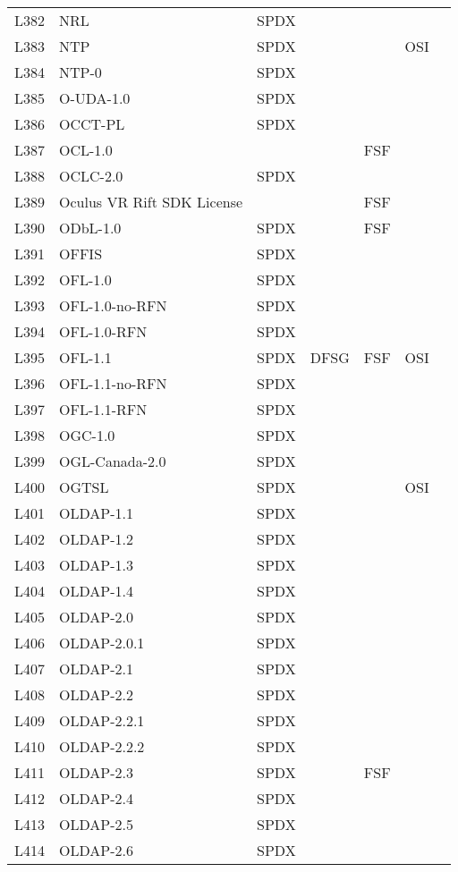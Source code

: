 \begin{longtable}[h]{m{2cm} | m{7cm} | c | c | c | c | c}
L382 & NRL & SPDX &  &  &  &  \\
L383 & NTP & SPDX &  &  & OSI &  \\
L384 & NTP-0 & SPDX &  &  &  &  \\
L385 & O-UDA-1.0 & SPDX &  &  &  &  \\
L386 & OCCT-PL & SPDX &  &  &  &  \\
L387 & OCL-1.0 &  &  & FSF &  &  \\
L388 & OCLC-2.0 & SPDX &  &  &  &  \\
L389 & Oculus VR Rift SDK License &  &  & FSF &  &  \\
L390 & ODbL-1.0 & SPDX &  & FSF &  &  \\
L391 & OFFIS & SPDX &  &  &  &  \\
L392 & OFL-1.0 & SPDX &  &  &  &  \\
L393 & OFL-1.0-no-RFN & SPDX &  &  &  &  \\
L394 & OFL-1.0-RFN & SPDX &  &  &  &  \\
L395 & OFL-1.1 & SPDX & DFSG & FSF & OSI &  \\
L396 & OFL-1.1-no-RFN & SPDX &  &  &  &  \\
L397 & OFL-1.1-RFN & SPDX &  &  &  &  \\
L398 & OGC-1.0 & SPDX &  &  &  &  \\
L399 & OGL-Canada-2.0 & SPDX &  &  &  &  \\
L400 & OGTSL & SPDX &  &  & OSI &  \\
L401 & OLDAP-1.1 & SPDX &  &  &  &  \\
L402 & OLDAP-1.2 & SPDX &  &  &  &  \\
L403 & OLDAP-1.3 & SPDX &  &  &  &  \\
L404 & OLDAP-1.4 & SPDX &  &  &  &  \\
L405 & OLDAP-2.0 & SPDX &  &  &  &  \\
L406 & OLDAP-2.0.1 & SPDX &  &  &  &  \\
L407 & OLDAP-2.1 & SPDX &  &  &  &  \\
L408 & OLDAP-2.2 & SPDX &  &  &  &  \\
L409 & OLDAP-2.2.1 & SPDX &  &  &  &  \\
L410 & OLDAP-2.2.2 & SPDX &  &  &  &  \\
L411 & OLDAP-2.3 & SPDX &  & FSF &  &  \\
L412 & OLDAP-2.4 & SPDX &  &  &  &  \\
L413 & OLDAP-2.5 & SPDX &  &  &  &  \\
L414 & OLDAP-2.6 & SPDX &  &  &  &  \\

\end{longtable}
